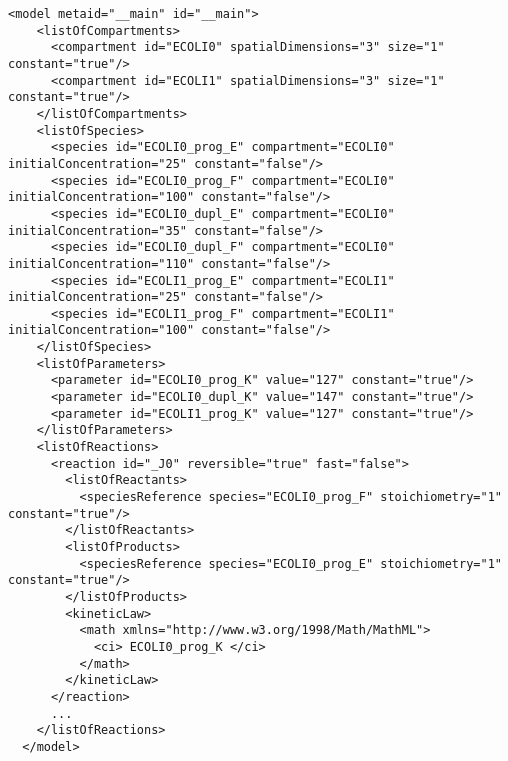 \begin{lstlisting}[style=SBML, caption=Generated SBML document.]
  <model metaid="__main" id="__main">
    <listOfCompartments>
      <compartment id="ECOLI0" spatialDimensions="3" size="1" constant="true"/>
      <compartment id="ECOLI1" spatialDimensions="3" size="1" constant="true"/>
    </listOfCompartments>
    <listOfSpecies>
      <species id="ECOLI0_prog_E" compartment="ECOLI0" initialConcentration="25" constant="false"/>
      <species id="ECOLI0_prog_F" compartment="ECOLI0" initialConcentration="100" constant="false"/>
      <species id="ECOLI0_dupl_E" compartment="ECOLI0" initialConcentration="35" constant="false"/>
      <species id="ECOLI0_dupl_F" compartment="ECOLI0" initialConcentration="110" constant="false"/>
      <species id="ECOLI1_prog_E" compartment="ECOLI1" initialConcentration="25" constant="false"/>
      <species id="ECOLI1_prog_F" compartment="ECOLI1" initialConcentration="100" constant="false"/>
    </listOfSpecies>
    <listOfParameters>
      <parameter id="ECOLI0_prog_K" value="127" constant="true"/>
      <parameter id="ECOLI0_dupl_K" value="147" constant="true"/>
      <parameter id="ECOLI1_prog_K" value="127" constant="true"/>
    </listOfParameters>
    <listOfReactions>
      <reaction id="_J0" reversible="true" fast="false">
        <listOfReactants>
          <speciesReference species="ECOLI0_prog_F" stoichiometry="1" constant="true"/>
        </listOfReactants>
        <listOfProducts>
          <speciesReference species="ECOLI0_prog_E" stoichiometry="1" constant="true"/>
        </listOfProducts>
        <kineticLaw>
          <math xmlns="http://www.w3.org/1998/Math/MathML">
            <ci> ECOLI0_prog_K </ci>
          </math>
        </kineticLaw>
      </reaction>
      ...
    </listOfReactions>
  </model>
\end{lstlisting}